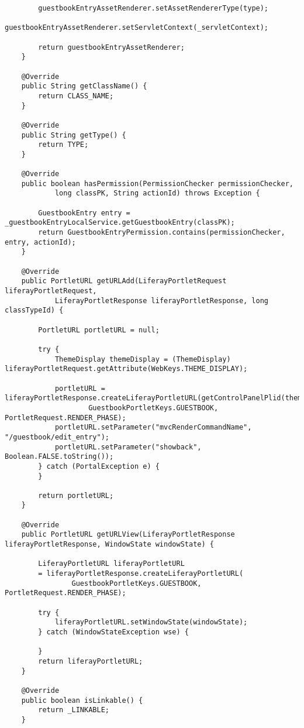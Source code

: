 \begin{verbatim}
        guestbookEntryAssetRenderer.setAssetRendererType(type);
        guestbookEntryAssetRenderer.setServletContext(_servletContext);

        return guestbookEntryAssetRenderer;
    }

    @Override
    public String getClassName() {
        return CLASS_NAME;
    }

    @Override
    public String getType() {
        return TYPE;
    }

    @Override
    public boolean hasPermission(PermissionChecker permissionChecker,
            long classPK, String actionId) throws Exception {

        GuestbookEntry entry = _guestbookEntryLocalService.getGuestbookEntry(classPK);
        return GuestbookEntryPermission.contains(permissionChecker, entry, actionId);
    }

    @Override
    public PortletURL getURLAdd(LiferayPortletRequest liferayPortletRequest,
            LiferayPortletResponse liferayPortletResponse, long classTypeId) {

        PortletURL portletURL = null;

        try {
            ThemeDisplay themeDisplay = (ThemeDisplay) liferayPortletRequest.getAttribute(WebKeys.THEME_DISPLAY);

            portletURL = liferayPortletResponse.createLiferayPortletURL(getControlPanelPlid(themeDisplay),
                    GuestbookPortletKeys.GUESTBOOK, PortletRequest.RENDER_PHASE);
            portletURL.setParameter("mvcRenderCommandName", "/guestbook/edit_entry");
            portletURL.setParameter("showback", Boolean.FALSE.toString());
        } catch (PortalException e) {
        }

        return portletURL;
    }

    @Override
    public PortletURL getURLView(LiferayPortletResponse liferayPortletResponse, WindowState windowState) {

        LiferayPortletURL liferayPortletURL
        = liferayPortletResponse.createLiferayPortletURL(
                GuestbookPortletKeys.GUESTBOOK, PortletRequest.RENDER_PHASE);

        try {
            liferayPortletURL.setWindowState(windowState);
        } catch (WindowStateException wse) {

        }
        return liferayPortletURL;
    }

    @Override
    public boolean isLinkable() {
        return _LINKABLE;
    }


\end{verbatim}
